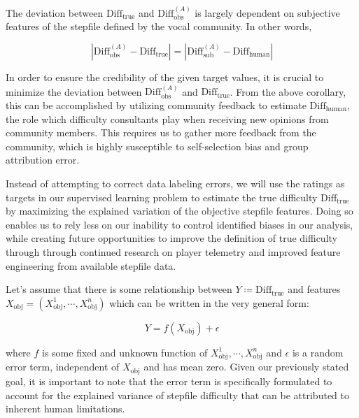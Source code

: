 \begin{corollary}
The deviation between $\text{Diff}_{\text{true}}$ and $\text{Diff}_{\text{obs}}^{(A)}$ is largely dependent on subjective features of the stepfile defined by the vocal community. In other words,

$$|\text{Diff}_{\text{obs}}^{(A)} - \text{Diff}_{\text{true}}| = |\text{Diff}_{\text{sub}}^{(A)} - \text{Diff}_{\text{human}}|$$
\end{corollary}

In order to ensure the credibility of the given target values, it is crucial to minimize the deviation between $\text{Diff}_{\text{obs}}^{(A)}$ and $\text{Diff}_{\text{true}}$. From the above corollary, this can be accomplished by utilizing community feedback to estimate $\text{Diff}_{\text{human}}$, the role which difficulty consultants play when receiving new opinions from community members. This requires us to gather more feedback from the community, which is highly susceptible to self-selection bias and group attribution error.

\vspace{2mm}

Instead of attempting to correct data labeling errors, we will use the ratings as targets in our supervised learning problem to estimate the true difficulty $\text{Diff}_{\text{true}}$ by maximizing the explained variation of the objective stepfile features. Doing so enables us to rely less on our inability to control identified biases in our analysis, while creating future opportunities to improve the definition of true difficulty through through continued research on player telemetry and improved feature engineering from available stepfile data.
\vspace{2mm}

Let's assume that there is some relationship between $Y \coloneq  \text{Diff}_{\text{true}}$ and features $X_{\text{obj}} = (X_{\text{obj}}^1, \cdots, X_{\text{obj}}^n)$ which can be written in the very general form:

$$Y = f(X_{\text{obj}}) + \epsilon$$

where $f$ is some fixed and unknown function of $X_{\text{obj}}^1, \cdots, X_{\text{obj}}^n$ and $\epsilon$ is a random error term, independent of $X_{\text{obj}}$ and has mean zero. Given our previously stated goal, it is important to note that the error term is specifically formulated to account for the explained variance of stepfile difficulty that can be attributed to inherent human limitations.

